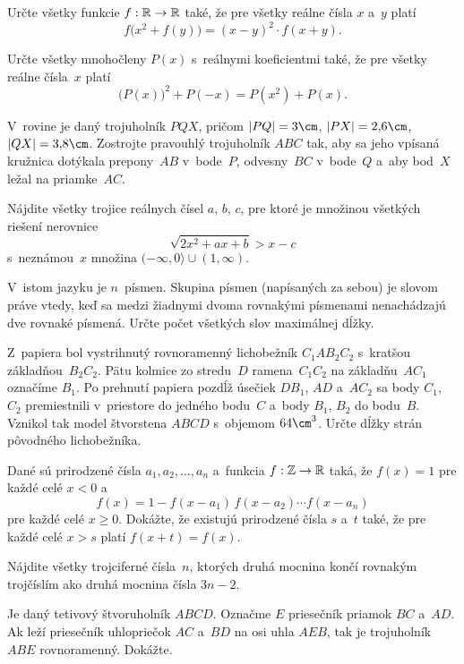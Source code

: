 {%
Určte všetky funkcie $f:\Bbb R\to\Bbb R$ také, že pre
všetky reálne čísla $x$ a~$y$ platí
$$
f\bigl(x^2+f(y)\bigr)=(x-y)^2\cdot f(x+y).
$$}

{%
Určte všetky mnohočleny $P(x)$ s~reálnymi koeficientmi také, že pre všetky
reálne čísla~$x$ platí
$$
\bigl(P(x)\bigr)^{2}+P(-x)=P(x^2)+P(x).
$$}

{%
V~rovine je daný trojuholník $PQX$, pričom $|PQ|=3\cm$,
$|PX|=2{,}6\cm$, $|QX|=3{,}8\cm$. Zostrojte pravouhlý
trojuholník $ABC$ tak, aby sa jeho vpísaná kružnica dotýkala
prepony~$AB$ v~bode~$P$, odvesny~$BC$ v~bode~$Q$ a~aby bod~$X$
ležal na priamke~$AC$.}

{%
Nájdite všetky trojice reálnych čísel $a$, $b$, $c$, pre ktoré
je množinou všetkých riešení nerovnice
$$
\sqrt{2x^2+ax+b}>x-c
$$
s~neznámou~$x$ množina $(-\infty,0\rangle\cup(1,\infty)$.}

{%
V~istom jazyku je $n$~písmen. Skupina písmen (napísaných za
sebou) je slovom práve vtedy, keď sa medzi žiadnymi dvoma rovnakými
písmenami nenachádzajú dve rovnaké písmená. Určte počet všetkých slov
maximálnej dĺžky.}

{%
Z~papiera bol vystrihnutý rovnoramenný lichobežník $C_1AB_2C_2$
s~kratšou základňou~$B_2C_2$. Pätu kolmice zo stredu~$D$ ramena~$C_1C_2$
na základňu~$AC_1$ označíme $B_1$. Po prehnutí papiera
pozdĺž úsečiek $DB_1$, $AD$ a~$AC_2$ sa body $C_1$, $C_2$
premiestnili v~priestore do jedného bodu~$C$ a~body $B_1$, $B_2$
do bodu~$B$. Vznikol tak model štvorstena $ABCD$ s~objemom
$64\cm^{3}$. Určte dĺžky strán pôvodného lichobežníka.}

{%
Dané sú prirodzené čísla $a_1,a_2,\dots,a_n$ a~funkcia
$f:\Bbb Z\to\Bbb R$ taká, že $f(x)=1$ pre každé celé $x<0$ a
$$
f(x)=1-f(x-a_1)\,f(x-a_2)\cdots f(x-a_n)
$$
pre každé celé $x\geq0$. Dokážte, že existujú prirodzené čísla
$s$ a~$t$ také, že pre každé celé $x>s$ platí $f(x+t)=f(x)$.}

{%
Nájdite všetky trojciferné čísla~$n$, ktorých druhá mocnina končí
rovnakým trojčíslím ako druhá mocnina čísla $3n-2$.}

{%
Je daný tetivový štvoruholník $ABCD$. Označme $E$ priesečník priamok
$BC$ a~$AD$. Ak leží priesečník uhlopriečok $AC$ a~$BD$ na
osi uhla $AEB$, tak je trojuholník $ABE$ rovnoramenný. Dokážte.}

